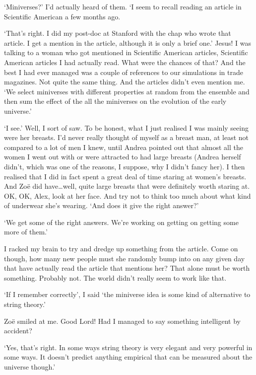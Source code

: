 `Miniverses?' I'd actually heard of them. `I seem to recall reading
an article in {\twelvesl Scientific American\/} a few months ago.

`That's right. I did my post-doc at Stanford with the chap who wrote
that article. I get a mention in the article, although it is only a
brief one.' Jesus! I was talking to a woman who got mentioned in
{\twelvesl Scientific American\/} articles, {\twelvesl Scientific American\/} articles I had actually read. What were the chances of that? And the best I had ever
managed was a couple of references to our simulations in trade
magazines. Not quite the same thing. And the articles didn't even
mention me. `We select miniverses with different properties at
random from the ensemble and then sum the effect of the all the
miniverses on the evolution of the early universe.'

`I see.' Well, I sort of saw. To be honest, what I just realised I
was mainly seeing were her breasts. I'd never really thought of
myself as a breast man, at least not compared to a lot of men I
knew, until Andrea pointed out that almost all the women I went out
with or were attracted to had large breasts (Andrea herself didn't,
which was one of the reasons, I suppose, why I didn't fancy her). I
then realised that I did in fact spent a great deal of time staring
at women's breasts. And Zo{\"e} did have\dots well, quite large
breasts that were definitely worth staring at. OK, OK, Alex, look at
her face. And try not to think {\twelveit too} much about what kind
of underwear she's wearing. `And does it give the right answer?'

`We get some of the right answers. We're working on getting on
getting some more of them.'

I racked my brain to try and dredge up something from the article.
Come on though, how many new people must she randomly bump into on any given day
that have actually read the article that mentions her? That alone must be
worth {\twelveit something}. Probably not. The world didn't really
seem to work like that.

`If I remember correctly', I said `the miniverse idea is some kind
of alternative to string theory.'

Zo{\"e} smiled at me. Good Lord! Had I managed to say something
intelligent by accident?

`Yes, that's right. In some ways string theory is very elegant and
very powerful in some ways. It doesn't predict anything empirical that can be
measured about the universe though.'

